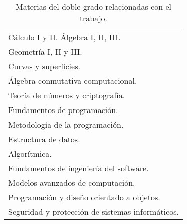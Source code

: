 \begin{table}[p]
  \myfloatalign
  \begin{tabularx}{\textwidth}{X} \toprule
    Cálculo I y II.
    Álgebra I, II, III. \\
    Geometría I, II y III. \\
    Curvas y superficies. \\
    Álgebra conmutativa computacional. \\
    Teoría de números y criptografía. \\

    Fundamentos de programación. \\
    Metodología de la programación. \\
    Estructura de datos. \\
    Algorítmica. \\
    Fundamentos de ingeniería del software. \\
    Modelos avanzados de computación. \\
    Programación y diseño orientado a objetos. \\
    Seguridad y protección de sistemas informáticos. \\
    \bottomrule
  \end{tabularx}
  \caption{Materias del doble grado relacionadas con el trabajo.}\label{tab:Asignaturas más relevantes}
\end{table}
